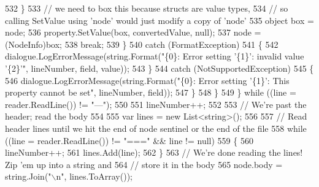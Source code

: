 \begin{DoxyCode}
532                                         \}
533                                         \textcolor{comment}{// we need to box this because structs are value types,}
534                                         \textcolor{comment}{// so calling SetValue using 'node' would just modify a copy of
       'node'}
535                                         \textcolor{keywordtype}{object} box = node;
536                                         property.SetValue(box, convertedValue, null);
537                                         node = (NodeInfo)box;
538                                         \textcolor{keywordflow}{break};
539                                     \}
540                                     \textcolor{keywordflow}{catch} (FormatException)
541                                     \{
542                                         dialogue.LogErrorMessage(string.Format(\textcolor{stringliteral}{"\{0\}: Error setting '\{1\}':
       invalid value '\{2\}'"}, lineNumber, field, value));
543                                     \}
544                                     \textcolor{keywordflow}{catch} (NotSupportedException)
545                                     \{
546                                         dialogue.LogErrorMessage(string.Format(\textcolor{stringliteral}{"\{0\}: Error setting '\{1\}':
       This property cannot be set"}, lineNumber, field));
547                                     \}
548                                 \}
549                             \} \textcolor{keywordflow}{while} ((line = reader.ReadLine()) != \textcolor{stringliteral}{"---"});
550 
551                             lineNumber++;
552 
553                             \textcolor{comment}{// We're past the header; read the body}
554 
555                             var lines = \textcolor{keyword}{new} List<string>();
556 
557                             \textcolor{comment}{// Read header lines until we hit the end of node sentinel or the end of the
       file}
558                             \textcolor{keywordflow}{while} ((line = reader.ReadLine()) != \textcolor{stringliteral}{"==="} && line != null)
559                             \{
560                                 lineNumber++;
561                                 lines.Add(line);
562                             \}
563                             \textcolor{comment}{// We're done reading the lines! Zip 'em up into a string and}
564                             \textcolor{comment}{// store it in the body}
565                             node.body = string.Join(\textcolor{stringliteral}{"\(\backslash\)n"}, lines.ToArray());

\end{DoxyCode}
